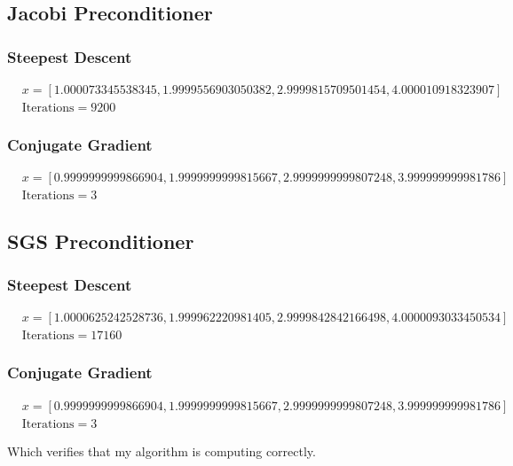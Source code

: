 \documentclass[12pt, letterpaper]{article}
\begin{document}
\subsection*{Jacobi Preconditioner}

\subsubsection*{Steepest Descent}
\[
\begin{aligned}
    &x = [1.000073345538345, 1.9999556903050382, 2.9999815709501454, 4.000010918323907] \\
    &\text{Iterations} = 9200
\end{aligned}
\]

\subsubsection*{Conjugate Gradient}
\[
\begin{aligned}
    &x = [0.9999999999866904, 1.9999999999815667, 2.9999999999807248, 3.999999999981786] \\
    &\text{Iterations} = 3
\end{aligned}
\]

\subsection*{SGS Preconditioner}

\subsubsection*{Steepest Descent}
\[
\begin{aligned}
    &x = [1.0000625242528736, 1.999962220981405, 2.9999842842166498, 4.0000093033450534] \\
    &\text{Iterations} = 17160
\end{aligned}
\]

\subsubsection*{Conjugate Gradient}
\[
\begin{aligned}
    &x = [0.9999999999866904, 1.9999999999815667, 2.9999999999807248, 3.999999999981786] \\
    &\text{Iterations} = 3
\end{aligned}
\]

Which verifies that my algorithm is computing correctly.
\end{document}
